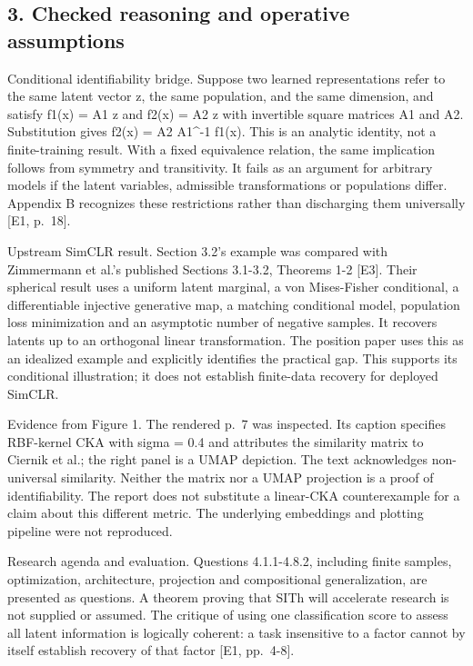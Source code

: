 \documentclass[10pt]{article}
\begin{document}
\subsection*{3. Checked reasoning and operative assumptions}
Conditional identifiability bridge. Suppose two learned representations refer to the same latent vector z, the same population, and the same dimension, and satisfy f1(x) = A1 z and f2(x) = A2 z with invertible square matrices A1 and A2. Substitution gives f2(x) = A2 A1\textasciicircum{}-1 f1(x). This is an analytic identity, not a finite-training result. With a fixed equivalence relation, the same implication follows from symmetry and transitivity. It fails as an argument for arbitrary models if the latent variables, admissible transformations or populations differ. Appendix B recognizes these restrictions rather than discharging them universally [E1, p. 18].\par
Upstream SimCLR result. Section 3.2’s example was compared with Zimmermann et al.’s published Sections 3.1-3.2, Theorems 1-2 [E3]. Their spherical result uses a uniform latent marginal, a von Mises-Fisher conditional, a differentiable injective generative map, a matching conditional model, population loss minimization and an asymptotic number of negative samples. It recovers latents up to an orthogonal linear transformation. The position paper uses this as an idealized example and explicitly identifies the practical gap. This supports its conditional illustration; it does not establish finite-data recovery for deployed SimCLR.\par
Evidence from Figure 1. The rendered p. 7 was inspected. Its caption specifies RBF-kernel CKA with sigma = 0.4 and attributes the similarity matrix to Ciernik et al.; the right panel is a UMAP depiction. The text acknowledges non-universal similarity. Neither the matrix nor a UMAP projection is a proof of identifiability. The report does not substitute a linear-CKA counterexample for a claim about this different metric. The underlying embeddings and plotting pipeline were not reproduced.\par
Research agenda and evaluation. Questions 4.1.1-4.8.2, including finite samples, optimization, architecture, projection and compositional generalization, are presented as questions. A theorem proving that SITh will accelerate research is not supplied or assumed. The critique of using one classification score to assess all latent information is logically coherent: a task insensitive to a factor cannot by itself establish recovery of that factor [E1, pp. 4-8].\par
\end{document}
